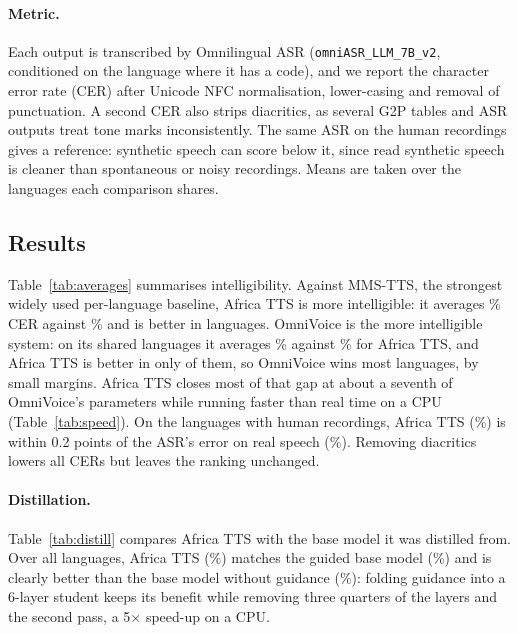 \documentclass[10pt,twocolumn]{article}
\newcommand{\att}{Africa TTS}
\begin{document}
\paragraph{Metric.} Each output is transcribed by Omnilingual ASR (\texttt{omniASR\_LLM\_7B\_v2},
conditioned on the language where it has a code), and we report the character error rate (CER)
after Unicode NFC normalisation, lower-casing and removal of punctuation. A second CER also
strips diacritics, as several G2P tables and ASR outputs treat tone marks inconsistently. The
same ASR on the human recordings gives a reference: synthetic speech can score below it, since
read synthetic speech is cleaner than spontaneous or noisy recordings. Means are taken over the
languages each comparison shares.

\subsection{Results}
Table~\ref{tab:averages} summarises intelligibility. Against MMS-TTS, the strongest widely used
per-language baseline, \att{} is more intelligible: it averages \avgMmsturbo{}\% CER against
\avgMmsMms{}\% and is better in \turboBeatsMms{} languages. OmniVoice is the more intelligible
system: on its \avgNOmni{} shared languages it averages \avgOmniOmni{}\% against
\avgOmniturbo{}\% for \att{}, and \att{} is better in only \turboBeatsOmni{} of them, so OmniVoice
wins most languages, by small margins. \att{} closes most of that gap at about a seventh of
OmniVoice's parameters while running faster than real time on a CPU (Table~\ref{tab:speed}).
On the \avgNreal{} languages with human recordings, \att{} (\avgrealturbo{}\%) is within
0.2 points of the ASR's error on real speech (\avgrealreal{}\%). Removing diacritics lowers all
CERs but leaves the ranking unchanged.



\paragraph{Distillation.} Table~\ref{tab:distill} compares \att{} with the base model it was
distilled from. Over all \distN{} languages, \att{} (\distturbo{}\%) matches the guided base
model (\distguided{}\%) and is clearly better than the base model without guidance
(\distunguided{}\%): folding guidance into a 6-layer student keeps its benefit while removing
three quarters of the layers and the second pass, a 5$\times$ speed-up on a CPU.
\end{document}
